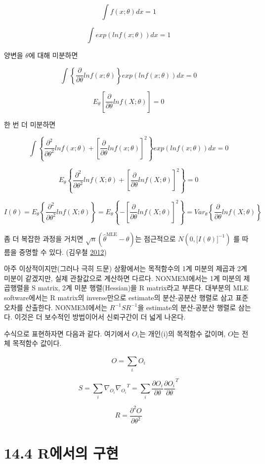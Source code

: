 \documentclass[
  10pt,
]{krantz}
\begin{document}
\[\int f(x;\theta)dx = 1\]

\[\int exp(lnf(x;\theta))dx = 1\]

양변을 \(\theta\)에 대해 미분하면

\[\int\left\{ \frac{\partial}{\partial\theta}lnf(x;\theta) \right\} exp(lnf(x;\theta))dx = 0\]

\[E_{\theta}\left\lbrack \frac{\partial}{\partial\theta}lnf(X;\theta) \right\rbrack = 0\]

한 번 더 미분하면

\[\int\left\{ \frac{\partial^{2}}{\partial\theta^{2}}lnf(x;\theta) + \left\lbrack \frac{\partial}{\partial\theta}lnf(x;\theta) \right\rbrack^{2} \right\} exp(lnf(x;\theta))dx = 0\]

\[E_{\theta}\left\{ \frac{\partial^{2}}{\partial\theta^{2}}lnf(X;\theta) + \left\lbrack \frac{\partial}{\partial\theta}lnf(X;\theta) \right\rbrack^{2} \right\} = 0\]

\[I(\theta) = E_{\theta}\left\{ \frac{\partial^{2}}{\partial\theta^{2}}lnf(X;\theta) \right\} = E_{\theta}\left\{ - \left\lbrack \frac{\partial}{\partial\theta}lnf(X;\theta) \right\rbrack^{2} \right\} = Var_{\theta}\left\{ \frac{\partial}{\partial\theta}lnf(X;\theta) \right\}\]

좀 더 복잡한 과정을 거치면 \(\sqrt{n}({\widehat{\theta}}^{\text{MLE}} - \theta)\)는
점근적으로 \(N(0,\lbrack I(\theta)\rbrack^{- 1})\) 를 따름을 증명할 수 있다. (김우철 \protect\hyperlink{ref-kim}{2012})

아주 이상적이지만(그러나 극히 드문) 상황에서는 목적함수의 1계 미분의 제곱과 2계 미분이 같겠지만, 실제 관찰값으로 계산하면
다르다. NONMEM에서는 1계 미분의 제곱행렬을 S matrix, 2계 미분 행렬(Hessian)을 R matrix라고
부른다. 대부분의 MLE software에서는 R matrix의 inverse만으로 estimate의 분산-공분산 행렬로 삼고
표준오차를 산출한다. NONMEM에서는 \(R^{- 1}SR^{- 1}\)을 estimate의 분산-공분산 행렬로 삼는다. 이것은
더 보수적인 방법이어서 신뢰구간이 더 넓게 나온다.

수식으로 표현하자면 다음과 같다. 여기에서 \(O_{i}\)는 개인(i)의 목적함수 값이며, \(O\)는 전체 목적함수 값이다.

\[O = \sum_{i}^{}O_{i}\]

\[S = \sum_{i}^{}{\nabla_{O_{i}}{\nabla_{O_{i}}}^{T}} = \sum_{i}^{}\frac{\partial O_{i}}{\partial\theta}\frac{\partial O_{i}}{\partial\theta}^{T}\]

\[R = \frac{\partial^{2}O}{\partial\theta^{2}}\]

\hypertarget{ruxc5d0uxc11cuxc758-uxad6cuxd604}{%
\section{14.4 R에서의 구현}\label{ruxc5d0uxc11cuxc758-uxad6cuxd604}}
\end{document}
